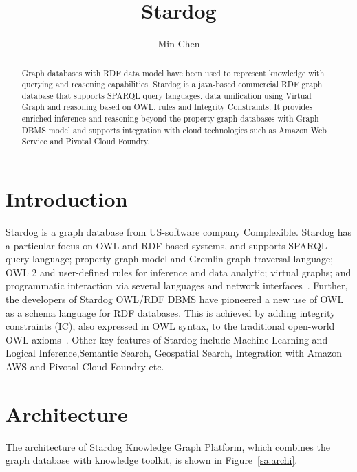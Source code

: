 \title{Stardog}


\author{Min Chen}

\begin{abstract}
	Graph databases with RDF data model have been used to represent 
	knowledge with querying and reasoning capabilities. Stardog is a 
	java-based commercial RDF graph database that supports SPARQL query 
	languages, data unification using Virtual Graph and reasoning based on 
	OWL, rules and Integrity Constraints. It provides enriched inference and 
	reasoning beyond the property graph databases with Graph DBMS model 
	and supports integration with cloud technologies such as Amazon Web 
	Service and Pivotal	Cloud Foundry.

\end{abstract}


\maketitle

\section{Introduction}

	Stardog is a graph database from US-software company
	Complexible. Stardog has a particular focus on OWL and RDF-based
	systems, and supports SPARQL query language; property graph model and 
	Gremlin graph traversal language; OWL 2 and user-defined rules for 
	inference and data analytic; virtual graphs; and
	programmatic interaction via several languages and network
	interfaces~\cite{hid-sp18-405-www-stardog-docs}. Further, the
	developers of Stardog OWL/RDF DBMS have pioneered a new use of OWL 
	as a schema language for RDF databases. This is achieved by adding
	integrity constraints (IC), also expressed in OWL syntax, to the traditional  
	open-world OWL axioms~\cite{hid-sp18-405-cer2012graphical-stardog}. 
	Other key features of Stardog include Machine Learning and Logical 
	Inference,Semantic Search, Geospatial Search, Integration with Amazon 
	AWS and Pivotal Cloud Foundry etc.\ 

\section{Architecture}
\label{s:arch}
	The architecture of Stardog Knowledge Graph Platform, which combines 
	the graph database with knowledge toolkit, is shown in 
	Figure~\ref{sa:archi}.

